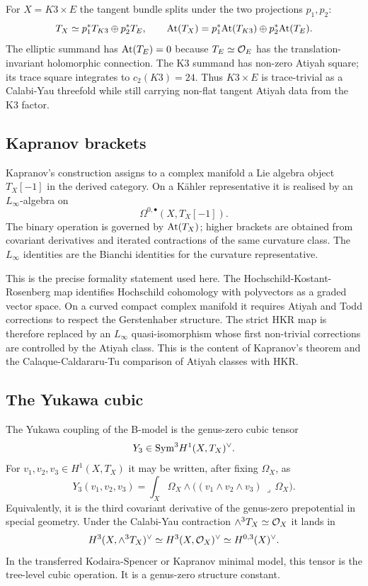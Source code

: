 For $X=K3\times E$ the tangent bundle splits under the two projections
$p_1,p_2$:
\[
T_X\simeq p_1^*T_{K3}\oplus p_2^*T_E,\qquad
\mathrm{At}(T_X)=p_1^*\mathrm{At}(T_{K3})\oplus p_2^*\mathrm{At}(T_E).
\]
The elliptic summand has $\mathrm{At}(T_E)=0$ because $T_E\simeq \mathcal{O}_E$ has the
translation-invariant holomorphic connection. The K3 summand has
non-zero Atiyah square; its trace square integrates to $c_2(K3)=24$.
Thus $K3\times E$ is trace-trivial as a Calabi-Yau threefold while still
carrying non-flat tangent Atiyah data from the K3 factor.

\subsection*{Kapranov brackets}
\label{subsec:bcov-yukawa-kapranov}

Kapranov's construction assigns to a complex manifold a Lie algebra
object $T_X[-1]$ in the derived category. On a K\"ahler representative it
is realised by an $L_\infty$-algebra on
\[
\Omega^{0,\bullet}(X,T_X[-1]).
\]
The binary operation is governed by $\mathrm{At}(T_X)$; higher brackets are
obtained from covariant derivatives and iterated contractions of the
same curvature class. The $L_\infty$ identities are the Bianchi identities
for the curvature representative.

This is the precise formality statement used here. The Hochschild-Kostant-
Rosenberg map identifies Hochschild cohomology with polyvectors as a
graded vector space. On a curved compact complex manifold it requires
Atiyah and Todd corrections to respect the Gerstenhaber structure. The
strict HKR map is therefore replaced by an $L_\infty$ quasi-isomorphism
whose first non-trivial corrections are controlled by the Atiyah class.
This is the content of Kapranov's theorem and the
Calaque-Caldararu-Tu comparison of Atiyah classes with HKR.

\subsection*{The Yukawa cubic}
\label{subsec:bcov-yukawa-y3}

The Yukawa coupling of the B-model is the genus-zero cubic tensor
\[
Y_3\in \mathrm{Sym}^3 H^1(X,T_X)^\vee .
\]
For $v_1,v_2,v_3\in H^1(X,T_X)$ it may be written, after fixing
$\Omega_X$, as
\[
Y_3(v_1,v_2,v_3)
=
\int_X
\Omega_X\wedge
\bigl((v_1\wedge v_2\wedge v_3)\,\lrcorner\,\Omega_X\bigr).
\]
Equivalently, it is the third covariant derivative of the genus-zero
prepotential in special geometry. Under the Calabi-Yau contraction
$\wedge^3T_X\simeq\mathcal{O}_X$ it lands in
\[
H^3(X,\wedge^3T_X)^\vee\simeq H^3(X,\mathcal{O}_X)^\vee
\simeq H^{0,3}(X)^\vee .
\]
In the transferred Kodaira-Spencer or Kapranov minimal model, this tensor
is the tree-level cubic operation. It is a genus-zero structure constant.

